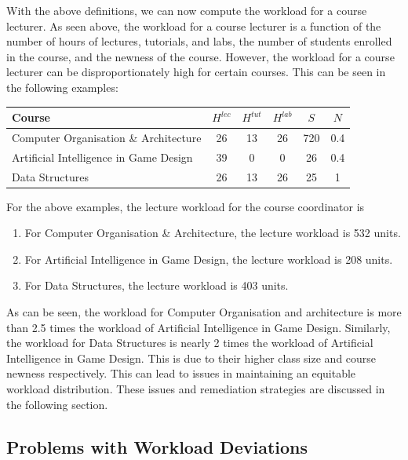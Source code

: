 With the above definitions, we can now compute the workload for a course lecturer. As seen above, the workload for a course lecturer is a function of the number of hours of lectures, tutorials, and labs, the number of students enrolled in the course, and the newness of the course. However, the workload for a course lecturer can be disproportionately high for certain courses. This can be seen in the following examples:

\begin{table}[ht]
  \centering
  \begin{tabular}{|l|c|c|c|c|c|}
    \hline
    \textbf{Course}                        & \(H^{lec}\) & \(H^{tut}\) & \(H^{lab}\) & \(S\) & \(N\) \\\hline
    Computer Organisation \& Architecture  & 26          & 13          & 26          & 720   & 0.4   \\\hline
    Artificial Intelligence in Game Design & 39          & 0           & 0           & 26    & 0.4   \\\hline
    Data Structures                        & 26          & 13          & 26          & 25    & 1     \\\hline
  \end{tabular}
\end{table}

For the above examples, the lecture workload for the course coordinator is

\begin{enumerate}
  \item For Computer Organisation \& Architecture, the lecture workload is 532 units.
  \item For Artificial Intelligence in Game Design, the lecture workload is 208 units.
  \item For Data Structures, the lecture workload is 403 units.
\end{enumerate}

As can be seen, the workload for Computer Organisation and architecture is more than 2.5 times the workload of Artificial Intelligence in Game Design. Similarly, the workload for Data Structures is nearly 2 times the workload of Artificial Intelligence in Game Design. This is due to their higher class size and course newness respectively. This can lead to issues in maintaining an equitable workload distribution. These issues and remediation strategies are discussed in the following section.

\subsection{Problems with Workload Deviations}

